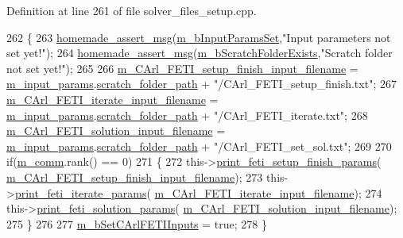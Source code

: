 Definition at line 261 of file solver\+\_\+files\+\_\+setup.\+cpp.


\begin{DoxyCode}
262 \{
263     \hyperlink{common__header_8h_a593ccc80b790b2268653fcf6597bf451}{homemade\_assert\_msg}(\hyperlink{classcarl_1_1_solver___files___setup_a7187af3c4a90be2d8ad2a25c11c0e910}{m\_bInputParamsSet},\textcolor{stringliteral}{"Input parameters not set
       yet!"});
264     \hyperlink{common__header_8h_a593ccc80b790b2268653fcf6597bf451}{homemade\_assert\_msg}(\hyperlink{classcarl_1_1_solver___files___setup_ac59627eab870e65887560595d0fbc025}{m\_bScratchFolderExists},\textcolor{stringliteral}{"Scratch folder not
       set yet!"});
265 
266     \hyperlink{classcarl_1_1_solver___files___setup_a24d691377ccdddf6fe29e3025bc53c13}{m\_CArl\_FETI\_setup\_finish\_input\_filename} = 
      \hyperlink{classcarl_1_1_solver___files___setup_aa5804bf6c6e506b382766333f232d3d5}{m\_input\_params}.\hyperlink{structcarl_1_1feti__setup__init__params_a57e553748427905076bae85d239f9537}{scratch\_folder\_path} + \textcolor{stringliteral}{"/CArl\_FETI\_setup\_finish.txt"};
267     \hyperlink{classcarl_1_1_solver___files___setup_a2e7e17a2974bf14101e4a2e37cc893fb}{m\_CArl\_FETI\_iterate\_input\_filename} = 
      \hyperlink{classcarl_1_1_solver___files___setup_aa5804bf6c6e506b382766333f232d3d5}{m\_input\_params}.\hyperlink{structcarl_1_1feti__setup__init__params_a57e553748427905076bae85d239f9537}{scratch\_folder\_path} + \textcolor{stringliteral}{"/CArl\_FETI\_iterate.txt"};
268     \hyperlink{classcarl_1_1_solver___files___setup_affd2303fa7ca09f66e2ca07709cc422a}{m\_CArl\_FETI\_solution\_input\_filename} = 
      \hyperlink{classcarl_1_1_solver___files___setup_aa5804bf6c6e506b382766333f232d3d5}{m\_input\_params}.\hyperlink{structcarl_1_1feti__setup__init__params_a57e553748427905076bae85d239f9537}{scratch\_folder\_path} + \textcolor{stringliteral}{"/CArl\_FETI\_set\_sol.txt"};
269 
270     \textcolor{keywordflow}{if}(\hyperlink{classcarl_1_1_solver___files___setup_aa8049195d5e383a0ca4295795e3f5751}{m\_comm}.rank() == 0)
271     \{
272         this->\hyperlink{classcarl_1_1_solver___files___setup_a32a0af7880856a835f42c60d2c4e2346}{print\_feti\_setup\_finish\_params}(
      \hyperlink{classcarl_1_1_solver___files___setup_a24d691377ccdddf6fe29e3025bc53c13}{m\_CArl\_FETI\_setup\_finish\_input\_filename});
273         this->\hyperlink{classcarl_1_1_solver___files___setup_aa83ae1990ac5fd3203004155d139b679}{print\_feti\_iterate\_params}(
      \hyperlink{classcarl_1_1_solver___files___setup_a2e7e17a2974bf14101e4a2e37cc893fb}{m\_CArl\_FETI\_iterate\_input\_filename});
274         this->\hyperlink{classcarl_1_1_solver___files___setup_abd020d2636217f7bebace1d2b484643f}{print\_feti\_solution\_params}(
      \hyperlink{classcarl_1_1_solver___files___setup_affd2303fa7ca09f66e2ca07709cc422a}{m\_CArl\_FETI\_solution\_input\_filename});
275     \}
276 
277     \hyperlink{classcarl_1_1_solver___files___setup_a6b870a23c889843abc86e19580f27a96}{m\_bSetCArlFETIInputs} = \textcolor{keyword}{true};
278 \}
\end{DoxyCode}
